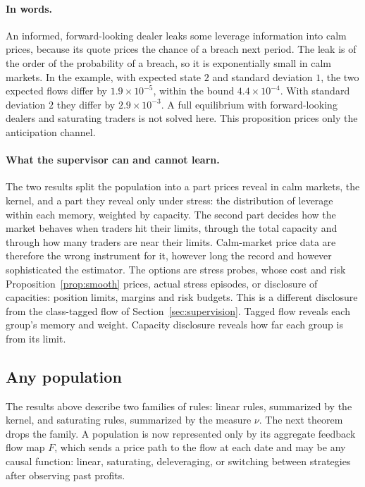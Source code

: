 \documentclass[12pt]{article}
\theoremstyle{definition}
\theoremstyle{remark}
\begin{document}
\paragraph{In words.} An informed, forward-looking dealer leaks some leverage information into calm prices, because its quote prices the chance of a breach next period. The leak is of the order of the probability of a breach, so it is exponentially small in calm markets. In the example, with expected state $2$ and standard deviation $1$, the two expected flows differ by $1.9\times10^{-5}$, within the bound $4.4\times10^{-4}$. With standard deviation $2$ they differ by $2.9\times10^{-3}$. A full equilibrium with forward-looking dealers and saturating traders is not solved here. This proposition prices only the anticipation channel.

\paragraph{What the supervisor can and cannot learn.} The two results split the population into a part prices reveal in calm markets, the kernel, and a part they reveal only under stress: the distribution of leverage within each memory, weighted by capacity. The second part decides how the market behaves when traders hit their limits, through the total capacity and through how many traders are near their limits. Calm-market price data are therefore the wrong instrument for it, however long the record and however sophisticated the estimator. The options are stress probes, whose cost and risk Proposition~\ref{prop:smooth} prices, actual stress episodes, or disclosure of capacities: position limits, margins and risk budgets. This is a different disclosure from the class-tagged flow of Section~\ref{sec:supervision}. Tagged flow reveals each group's memory and weight. Capacity disclosure reveals how far each group is from its limit.

\subsection{Any population}\label{sec:anypop}

The results above describe two families of rules: linear rules, summarized by the kernel, and saturating rules, summarized by the measure $\nu$. The next theorem drops the family. A population is now represented only by its aggregate feedback flow map $F$, which sends a price path to the flow at each date and may be any causal function: linear, saturating, deleveraging, or switching between strategies after observing past profits.
\end{document}
